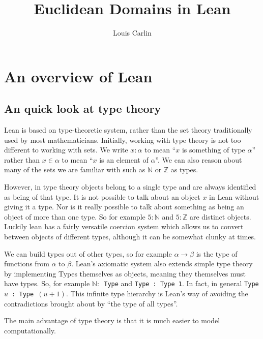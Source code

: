 \documentclass{article}
\author{Louis Carlin}
\title{Euclidean Domains in Lean}
\newcommand{\Z}{\ensuremath{\mathbb{Z}}}
\newcommand{\N}{\ensuremath{\mathbb{N}}}
\renewcommand{\a}{\alpha}
\newcommand{\ct}{\texttt}
\begin{document}
\maketitle
\newpage 


\section{An overview of Lean}

\subsection{An quick look at type theory}
Lean is based on type-theoretic system, rather than the set theory traditionally used by most mathematicians. 
Initially, working with type theory is not too different to working with sets. 
We write $x:\a$ to mean ``$x$ is something of type $\a$'' rather than $x \in \a$ to mean ``$x$ is an element of $\a$''. 
We can also reason about many of the sets we are familiar with such as $\N$ or $\Z$ as types.

However, in type theory objects belong to a single type and are always identified as being of that type.
It is not possible to talk about an object $x$ in Lean without giving it a type.
Nor is it really possible to talk about something as being an object of more than one type.
So for example $5:\N$ and $5:\Z$ are distinct objects.
Luckily lean has a fairly versatile coercion system which allows us to convert between objects of different types, although it can be somewhat clunky at times.

We can build types out of other types, so for example $\a \to \beta$ is the type of functions from $\a$ to $\beta$. 
Lean's axiomatic system also extends simple type theory by implementing Types themselves as objects, meaning they themselves must have types.
So, for example \ct{$\N:$ Type} and \ct{Type : Type 1}.
In fact, in general \ct{Type $u$ : Type $(u+1)$}. 
This infinite type hierarchy is Lean's way of avoiding the contradictions brought about by ``the type of all types''.


The main advantage of type theory is that it is much easier to model computationally.
\end{document}
